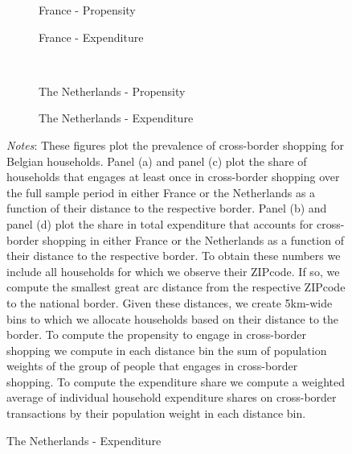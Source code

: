 \begin{figure}[H]
    \centering
    \caption{Cross-border shopping - Distance to the border}
    \label{fig: app_border_eff_spectest_cbshopping_distance}
    \begin{subfigure}[t]{.49\textwidth}
         \centering
         \caption{France - Propensity}
         \scalebox{0.45}{}
     \end{subfigure}
     \begin{subfigure}[t]{.49\textwidth}
         \centering
         \caption{France - Expenditure}
         \scalebox{0.45}{}
     \end{subfigure}\\
     \begin{subfigure}[t]{.49\textwidth}
         \centering
         \caption{The Netherlands - Propensity}
         \scalebox{0.45}{}
     \end{subfigure}
     \begin{subfigure}[t]{.49\textwidth}
         \centering
         \caption{The Netherlands - Expenditure}
         \scalebox{0.45}{}
     \end{subfigure}
     \parbox{\textwidth}{
        \begin{spacing}{1} 
            {\footnotesize 
            \textit{Notes}: These figures plot the prevalence of cross-border shopping for Belgian households. Panel (a) and panel (c) plot the share of households that engages at least once in cross-border shopping over the full sample period in either France or the Netherlands as a function of their distance to the respective border. Panel (b) and panel (d) plot the share in total expenditure that accounts for cross-border shopping in either France or the Netherlands as a function of their distance to the respective border. To obtain these numbers we include all households for which we observe their ZIPcode. If so, we compute the smallest great arc distance from the respective ZIPcode to the national border. Given these distances, we create 5km-wide bins to which we allocate households based on their distance to the border. To compute the propensity to engage in cross-border shopping we compute in each distance bin the sum of population weights of the group of people that engages in cross-border shopping. To compute the expenditure share we compute a weighted average of individual household expenditure shares on cross-border transactions by their population weight in each distance bin.}
        \end{spacing}}
 \end{figure} 

